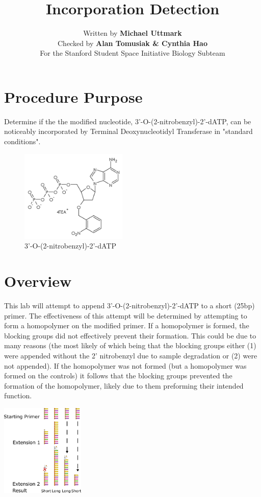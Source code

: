 \documentclass[letterpaper]{article}
\title{\BdATP{} Incorporation Detection} %
\author{Written by \textbf{Michael Uttmark}\\ %
		Checked by \textbf{Alan Tomusiak \& Cynthia Hao}\\ %
        For the Stanford Student Space Initiative Biology Subteam}
\newcommand{\tdt}{Terminal Deoxynucleotidyl Transferase}
\newcommand{\BdATP}{3'-O-(2-nitrobenzyl)-2'-dATP}
\begin{document}
\maketitle
\section{Procedure Purpose} %
Determine if the the modified nucleotide, \BdATP{}, can be noticeably incorporated by \tdt{} in "standard conditions". 

\begin{figure}[ht]
\centering
\includegraphics[width=2in]{1.png}
\caption{\BdATP{}}
\label{bdatp}
\end{figure}
\section{Overview} %
This lab will attempt to append \BdATP{} to a short (25bp) primer. The effectiveness of this attempt will be determined by attempting to form a homopolymer on the modified primer. If a homopolymer is formed, the blocking groups did not effectively prevent their formation. This could be due to many reasons (the most likely of which being that the blocking groups either (1) were appended without the 2' nitrobenzyl due to sample degradation or (2) were not appended). If the homopolymer was not formed (but a homopolymer was formed on the controls) it follows that the blocking groups prevented the formation of the homopolymer, likely due to them preforming their intended function.
\\
\begin{center}\includegraphics[width=0.3\textwidth]{summary.png}
\end{center}
\end{document}
